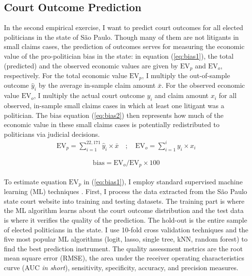 \documentclass[11pt]{article}
\newcommand{\refp}[1]{(\ref{#1})}
\begin{document}
\subsection{Court Outcome Prediction} \label{subsec:methods2_paper2}

In the second empirical exercise, I want to predict court outcomes for all elected politicians in the state of São Paulo. Though many of them are not litigants in small claims cases, the prediction of outcomes serves for measuring the economic value of the pro-politician bias in the state: in equation \refp{eq:bias1}, the total (predicted) and the observed economic values are given by $\text{EV}_{p}$ and $\text{EV}_{o}$, respectively. For the total economic value $\text{EV}_{p}$, I multiply the out-of-sample outcome $\hat{y}_{i}$ by the average in-sample claim amount $\bar{x}$. For the observed economic value $\text{EV}_{o}$, I multiply the actual court outcome $y_{i}$ and claim amount $x_{i}$ for all observed, in-sample small claims cases in which at least one litigant was a politician. The bias equation \refp{eq:bias2} then represents how much of the economic value in these small claims cases is potentially redistributed to politicians via judicial decisions. \\

\begin{align}
  \text{EV}_{p} = \sum_{i = 1}^{22,171} \hat{y}_{i} \times \bar{x} \label{eq:bias1} \quad ; \quad \text{EV}_{o} = \sum_{i = 1}^{i} y_{i} \times x_{i}
\end{align}

\begin{equation}
  \text{bias} = \text{EV}_{o} / \text{EV}_{p} \times 100 \label{eq:bias2}
\end{equation} \\

To estimate equation $\text{EV}_{p}$ in \refp{eq:bias1}, I employ standard supervised machine learning (ML) techniques \citep{AtheypredictionUsingbig2017,KleinbergHumanDecisionsMachine2018,AtheyImpactMachineLearning2019}. First, I process the data extracted from the São Paulo state court website into training and testing datasets. The training part is where the ML algorithm learns about the court outcome distribution and the test data is where it verifies the quality of the prediction. The hold-out is the entire sample of elected politicians in the state. I use 10-fold cross validation techniques and the five most popular ML algorithms (logit, lasso, single tree, kNN, random forest) to find the best prediction instrument. The quality assessment metrics are the root mean square error (RMSE), the area under the receiver operating characteristics curve (AUC \emph{in short}), sensitivity, specificity, accuracy, and precision measures.
\end{document}
